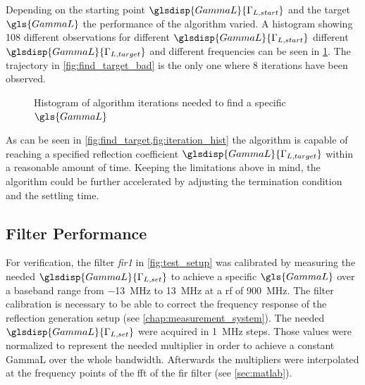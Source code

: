 \documentclass[12pt,a4paper,parskip=full,abstract=true,BCOR=12mm,twoside,open=right]{scrreprt}
\def\device#1{\mbox{\textit{#1}}}
\begin{document}
Depending on the starting point $\glsdisp{GammaL}{\Gamma_{L,start}}$ and the target $\gls{GammaL}$
the performance of the algorithm varied. A histogram showing 108 different
observations for different $\glsdisp{GammaL}{\Gamma_{L,start}}$ different $\glsdisp{GammaL}{\Gamma_{L,target}}$ and
different frequencies can be seen in \cref{fig:iteration_hist}. The trajectory
in \cref{fig:find_target_bad} is the only one where 8 iterations have been observed.

\begin{figure}[htb]
    \centering
    \caption{Histogram of algorithm iterations needed to find a specific $\gls{GammaL}$}
    \label{fig:iteration_hist}
\end{figure}

As can be seen in \cref{fig:find_target,fig:iteration_hist} the algorithm is capable
of reaching a specified reflection coefficient $\glsdisp{GammaL}{\Gamma_{L,target}}$ within a reasonable
amount of time. Keeping the limitations above in mind, the algorithm could be further
accelerated by adjusting the termination condition and the settling time.

\subsection{Filter Performance}
\label{sec:filter}

For verification, the filter \device{fir1} in \cref{fig:test_setup} was calibrated
by measuring the needed $\glsdisp{GammaL}{\Gamma_{L,set}}$ to achieve a specific $\gls{GammaL}$ over a
baseband range from \SI{-13}{\mega\hertz} to \SI{13}{\mega\hertz} at a \gls{rf} of
\SI{900}{\mega\hertz}. The filter calibration is necessary to be able to correct
the frequency response of the reflection generation setup (see \cref{chap:measurement_system}). The needed
$\glsdisp{GammaL}{\Gamma_{L,set}}$ were acquired in \SI{1}{\mega\hertz} steps. Those
values were normalized to represent the needed multiplier in order
to achieve a constant \gls{GammaL} over the whole bandwidth. Afterwards the multipliers
were interpolated at the frequency points of the \gls{fft} of the \gls{fir} filter (see \cref{sec:matlab}).
\end{document}

